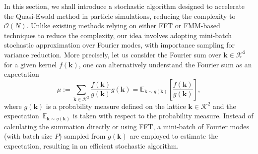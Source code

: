 In this section, we shall introduce a stochastic algorithm designed to accelerate the Quasi-Ewald method in particle simulations, reducing the complexity to $\mathcal{O}(N)$. 
Unlike existing methods relying on either FFT or FMM-based techniques to reduce the complexity, our idea involves adopting mini-batch stochastic approximation over Fourier modes, with importance sampling for variance reduction. 
More precisely, let us consider the Fourier sum over $\bm k \in \mathcal{K}^2$ for a given kernel $f(\bm{k})$,
one can alternatively understand the Fourier sum as an expectation
\begin{equation}
	\mu:=\sum_{\bm{k}\in\mathcal{K}^2}\frac{f(\bm{k})}{g(\bm{k})}g(\bm{k})=\mathbb{E}_{\bm k\sim g(\bm{k})}\left[\frac{f(\bm{k})}{g(\bm{k})}\right],
\end{equation}
where $g(\bm{k})$ is a probability measure defined on the lattice $\bm k \in \mathcal{K}^2$ and the expectation~$\mathbb{E}_{\bm k\sim g(\bm{k})}$ is taken with respect to the probability measure.
Instead of calculating the summation directly or using FFT, a mini-batch of Fourier modes (with batch size $P$) sampled from $g(\bm{k})$ are employed to estimate the expectation, resulting in an efficient stochastic algorithm.

